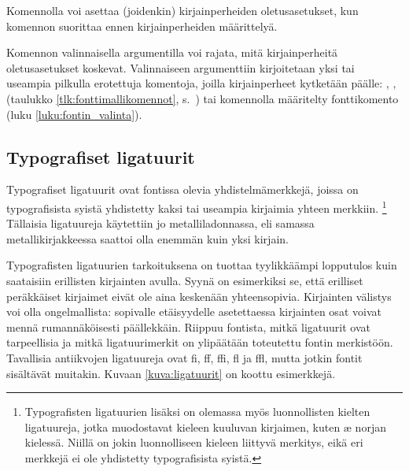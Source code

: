 Komennolla  voi asettaa (joidenkin)
kirjainperheiden oletusasetukset, kun komennon suorittaa ennen
kirjainperheiden määrittelyä.

\begin{koodilohkosis}
\end{koodilohkosis}

Komennon valinnaisella argumentilla voi rajata, mitä kirjainperheitä
oletusasetukset koskevat. Valinnaiseen argumenttiin kirjoitetaan yksi
tai useampia pilkulla erotettuja komentoja, joilla kirjainperheet
kytketään päälle: , ,
 (taulukko \ref{tlk:fonttimallikomennot},
s.~\pageref{tlk:fonttimallikomennot}) tai komennolla
 määritelty fonttikomento (luku
\ref{luku:fontin_valinta}).

\subsection{Typografiset ligatuurit}
\label{luku:typo_liga}

Typografiset ligatuurit ovat fontissa olevia yhdistelmämerkkejä, joissa
on typografisista syistä yhdistetty kaksi tai useampia kirjaimia yhteen
merkkiin.%
\footnote{Typografisten ligatuurien lisäksi on olemassa myös
  luonnollisten kielten ligatuureja, jotka muodostavat kieleen kuuluvan
  kirjaimen, kuten æ norjan kielessä. Niillä on jokin luonnolliseen
  kieleen liittyvä merkitys, eikä eri merkkejä ei ole yhdistetty
  typografisista syistä.} Tällaisia ligatuureja käytettiin jo
metalliladonnassa, eli samassa metallikirjakkeessa saattoi olla enemmän
kuin yksi kirjain.

Typografisten ligatuurien tarkoituksena on tuottaa tyylikkäämpi
lopputulos kuin saataisiin erillisten kirjainten avulla. Syynä on
esimerkiksi se, että erilliset peräkkäiset kirjaimet eivät ole aina
keskenään yhteensopivia. Kirjainten välistys voi olla ongelmallista:
sopivalle etäisyydelle asetettaessa kirjainten osat voivat mennä
rumannäköisesti päällekkäin. Riippuu fontista, mitkä ligatuurit ovat
tarpeellisia ja mitkä ligatuurimerkit on ylipäätään toteutettu fontin
merkistöön. Tavallisia antiikvojen ligatuureja ovat fi, ff, ffi, fl ja
ffl, mutta jotkin fontit sisältävät muitakin. Kuvaan
\ref{kuva:ligatuurit} on koottu esimerkkejä.


